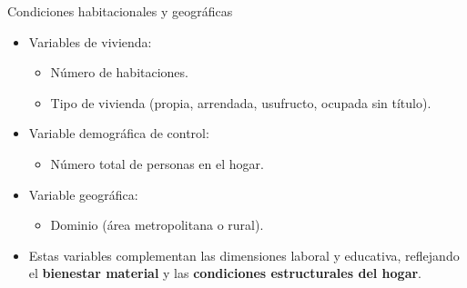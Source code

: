 \documentclass[10pt]{beamer}
\begin{document}
\begin{frame}{Condiciones habitacionales y geográficas}
\small
\begin{itemize}
    \item Variables de vivienda:
    \begin{itemize}
        \item Número de habitaciones.
        \item Tipo de vivienda (propia, arrendada, usufructo, ocupada sin título).
    \end{itemize}
    \item Variable demográfica de control:
    \begin{itemize}
        \item Número total de personas en el hogar.
    \end{itemize}
    \item Variable geográfica:
    \begin{itemize}
        \item Dominio (área metropolitana o rural).
    \end{itemize}
    \item Estas variables complementan las dimensiones laboral y educativa, reflejando el \textbf{bienestar material} y las \textbf{condiciones estructurales del hogar}.
\end{itemize}
\end{frame}
\end{document}
